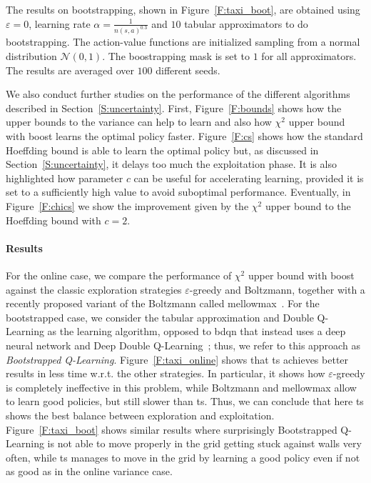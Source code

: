 The results on bootstrapping, shown in Figure~\ref{F:taxi_boot}, are obtained using $\varepsilon = 0$, learning rate $\alpha = \frac{1}{n(s,a)^{0.3}}$ and $10$ tabular approximators to do bootstrapping. The action-value functions are initialized sampling from a normal distribution $\mathcal{N}(0, 1)$. The boostrapping mask is set to $1$ for all approximators. The results are averaged over $100$ different seeds.

We also conduct further studies on the performance of the different algorithms described in Section~\ref{S:uncertainty}. First, Figure~\ref{F:bounds} shows how the upper bounds to the variance can help to learn and also how $\chi^2$ upper bound with boost learns the optimal policy faster. Figure~\ref{F:cs} shows how the standard Hoeffding bound is able to learn the optimal policy but, as discussed in Section~\ref{S:uncertainty}, it delays too much the exploitation phase. It is also highlighted how parameter $c$ can be useful for accelerating learning, provided it is set to a sufficiently high value to avoid suboptimal performance. Eventually, in Figure~\ref{F:chics} we show the improvement given by the $\chi^2$ upper bound to the Hoeffding bound with $c = 2$.
\paragraph{Results}For the online case, we compare the performance of $\chi^2$ upper bound with boost against the classic exploration strategies $\varepsilon$-greedy and Boltzmann, together with a recently proposed variant of the Boltzmann called mellowmax~\cite{pmlr-v70-asadi17a}. For the bootstrapped case, we consider the tabular approximation and Double Q-Learning as the learning algorithm, opposed to \gls{bdqn} that instead uses a deep neural network and Deep Double Q-Learning~\cite{van2016deep}; thus, we refer to this approach as \textit{Bootstrapped Q-Learning}. Figure~\ref{F:taxi_online} shows that \gls{ts} achieves better results in less time w.r.t. the other strategies. In particular, it shows how $\varepsilon$-greedy is completely ineffective in this problem, while Boltzmann and mellowmax allow to learn good policies, but still slower than \gls{ts}. Thus, we can conclude that here \gls{ts} shows the best balance between exploration and exploitation. Figure~\ref{F:taxi_boot} shows similar results where surprisingly Bootstrapped Q-Learning is not able to move properly in the grid getting stuck against walls very often, while \gls{ts} manages to move in the grid by learning a good policy even if not as good as in the online variance case.

